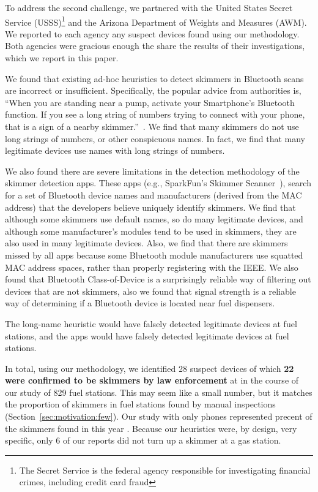 To address the second challenge, we partnered with the United States Secret
Service (USSS)\footnote{The Secret Service is the federal agency responsible
for investigating financial crimes, including credit card fraud} and the
Arizona Department of Weights and Measures (AWM).
%
We reported to each agency any suspect devices found using our methodology.
Both agencies were gracious enough the share the results of their
investigations, which we report in this paper.

We found that existing ad-hoc heuristics to detect skimmers in Bluetooth scans
are incorrect or insufficient.
%
Specifically, the popular advice from authorities is, ``When you are standing
near a pump, activate your Smartphone’s Bluetooth function. If you see a long
string of numbers trying to connect with your phone, that is a sign of a nearby
skimmer.''~\cite{ag-mn-skimmers}.
%
We find that many skimmers do not use long strings of numbers, or other
conspicuous names.
%
In fact, we find that many legitimate devices use names with long strings of
numbers.
  
We also found there are severe limitations in the detection methodology of the
skimmer detection apps.
%
These apps (e.g., SparkFun's Skimmer Scanner~\cite{sparkfunapp}), search for a
set of Bluetooth device names and manufacturers (derived from the MAC address)
that the developers believe uniquely identify skimmers.
%
We find that although some skimmers use default names, so do many legitimate
devices, and 
%
although some manufacturer's modules tend to be used in skimmers, they are also
used in many legitimate devices.
%
Also, we find that there are skimmers missed by all apps because some Bluetooth
module manufacturers use squatted MAC address spaces, rather than properly
registering with the IEEE.
%
We also found that Bluetooth Class-of-Device is a surprisingly reliable way of
filtering out devices that are not skimmers, also we found that signal strength
is a reliable way of determining if a Bluetooth device is located near fuel
dispensers.

The long-name heuristic would have falsely detected  legitimate
devices at  fuel stations, and the apps would have falsely detected
 legitimate devices at  fuel stations.

In total, using our methodology, we identified 28 suspect devices of which
\textbf{22 were confirmed to be skimmers by law enforcement} at  in the course of our study of 829 fuel stations.
%
This may seem like a small number, but it matches the proportion of skimmers in
fuel stations found by manual inspections (Section~\ref{sec:motivation:few}).
%
Our study with only  phones represented  precent of the
skimmers found in this year .
%
Because our heuristics were, by design, very specific, only 6 of our reports
did not turn up a skimmer at a gas station.

